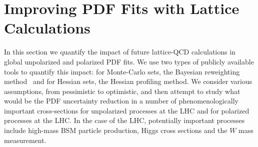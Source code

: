 \section{Improving PDF Fits with Lattice Calculations}
\label{sec:projections}

In this section we quantify the impact of future lattice-QCD calculations
in global unpolarized and polarized PDF fits.
%
We use two types of publicly available tools to quantify this
impact: for Monte-Carlo sets, the Bayesian reweighting
method~\cite{Ball:2011gg,Ball:2010gb} and for Hessian sets,
the Hessian profiling method.
%
We consider various assumptions, from pessimistic to optimistic,
and then attempt to study what would be the PDF uncertainty
reduction in a number of phenomenologically
important cross-sections for unpolarized processes at the
LHC and for polarized processes at the LHC.
%
In the case of the LHC, potentially important processes include
high-mass BSM particle production, Higgs cross sections and
the $W$ mass measurement.

